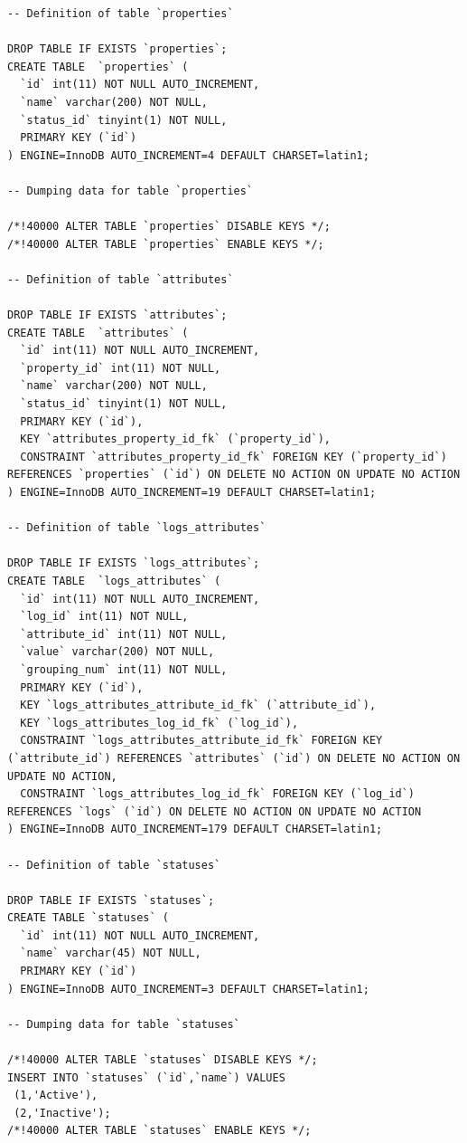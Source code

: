 \documentclass[11pt
  , a4paper
  , article
  , oneside
]{memoir}
\begin{document}
\begin{lstlisting}[style=termstylenumber, caption={olog\_schema.sql}, label={list:nfsroot-file}]
-- Definition of table `properties`

DROP TABLE IF EXISTS `properties`;
CREATE TABLE  `properties` (
  `id` int(11) NOT NULL AUTO_INCREMENT,
  `name` varchar(200) NOT NULL,
  `status_id` tinyint(1) NOT NULL,
  PRIMARY KEY (`id`)
) ENGINE=InnoDB AUTO_INCREMENT=4 DEFAULT CHARSET=latin1;

-- Dumping data for table `properties`

/*!40000 ALTER TABLE `properties` DISABLE KEYS */;
/*!40000 ALTER TABLE `properties` ENABLE KEYS */;

-- Definition of table `attributes`

DROP TABLE IF EXISTS `attributes`;
CREATE TABLE  `attributes` (
  `id` int(11) NOT NULL AUTO_INCREMENT,
  `property_id` int(11) NOT NULL,
  `name` varchar(200) NOT NULL,
  `status_id` tinyint(1) NOT NULL,
  PRIMARY KEY (`id`),
  KEY `attributes_property_id_fk` (`property_id`),
  CONSTRAINT `attributes_property_id_fk` FOREIGN KEY (`property_id`) REFERENCES `properties` (`id`) ON DELETE NO ACTION ON UPDATE NO ACTION
) ENGINE=InnoDB AUTO_INCREMENT=19 DEFAULT CHARSET=latin1;

-- Definition of table `logs_attributes`

DROP TABLE IF EXISTS `logs_attributes`;
CREATE TABLE  `logs_attributes` (
  `id` int(11) NOT NULL AUTO_INCREMENT,
  `log_id` int(11) NOT NULL,
  `attribute_id` int(11) NOT NULL,
  `value` varchar(200) NOT NULL,
  `grouping_num` int(11) NOT NULL,
  PRIMARY KEY (`id`),
  KEY `logs_attributes_attribute_id_fk` (`attribute_id`),
  KEY `logs_attributes_log_id_fk` (`log_id`),
  CONSTRAINT `logs_attributes_attribute_id_fk` FOREIGN KEY (`attribute_id`) REFERENCES `attributes` (`id`) ON DELETE NO ACTION ON UPDATE NO ACTION,
  CONSTRAINT `logs_attributes_log_id_fk` FOREIGN KEY (`log_id`) REFERENCES `logs` (`id`) ON DELETE NO ACTION ON UPDATE NO ACTION
) ENGINE=InnoDB AUTO_INCREMENT=179 DEFAULT CHARSET=latin1;

-- Definition of table `statuses`

DROP TABLE IF EXISTS `statuses`;
CREATE TABLE `statuses` (
  `id` int(11) NOT NULL AUTO_INCREMENT,
  `name` varchar(45) NOT NULL,
  PRIMARY KEY (`id`)
) ENGINE=InnoDB AUTO_INCREMENT=3 DEFAULT CHARSET=latin1;

-- Dumping data for table `statuses`

/*!40000 ALTER TABLE `statuses` DISABLE KEYS */;
INSERT INTO `statuses` (`id`,`name`) VALUES
 (1,'Active'),
 (2,'Inactive');
/*!40000 ALTER TABLE `statuses` ENABLE KEYS */;


\end{lstlisting}
\end{document}

